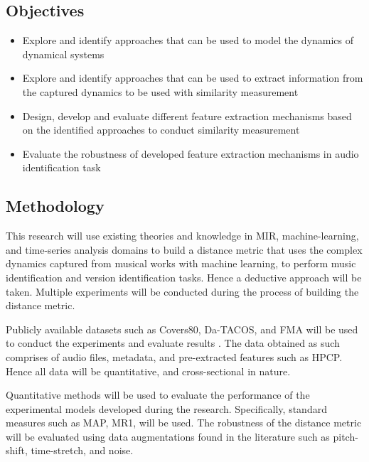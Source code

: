 \documentclass[../main.tex]{subfiles}
\begin{document}
\newpage
\subsection{Objectives}
\begin{itemize}
  \item Explore and identify approaches that can be used to model the dynamics of dynamical systems
  \item Explore and identify approaches that can be used to extract information from the captured dynamics to be used with similarity measurement
  \item Design, develop and evaluate different feature extraction mechanisms based on the identified approaches to conduct similarity measurement
  \item Evaluate the robustness of developed feature extraction mechanisms in audio identification task
\end{itemize}



\subsection{Methodology}

\par
This research will use existing theories and knowledge in \gls{MIR}, machine-learning, and time-series analysis domains to build a distance metric that uses the complex dynamics captured from musical works with machine learning, to perform music identification and version identification tasks. Hence a deductive approach will be taken. Multiple experiments will be conducted during the process of building the distance metric.

\par
Publicly available datasets such as Covers80, Da-TACOS, and FMA will be used to conduct the experiments and evaluate results \cite{Covers80CoverSong,yesilerDaTACOSDatasetCover2019,defferrardFMADatasetMusic2017}. The data obtained as such comprises of audio files, metadata, and pre-extracted features such as \gls{HPCP}. Hence all data will be quantitative, and cross-sectional in nature.

\par
Quantitative methods will be used to evaluate the performance of the experimental models developed during the research. Specifically, standard measures such as \gls{MAP}, \gls{MR1}, will be used. The robustness of the distance metric will be evaluated using data augmentations found in the literature such as pitch-shift, time-stretch, and noise.
\end{document}
